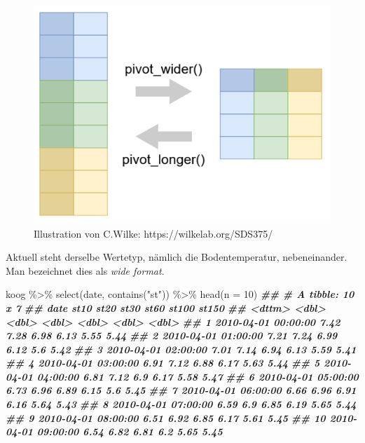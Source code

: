 \documentclass[
]{article}
\newenvironment{Shaded}{\begin{snugshade}}{\end{snugshade}}
\newcommand{\AttributeTok}[1]{\textcolor[rgb]{0.77,0.63,0.00}{#1}}
\newcommand{\DecValTok}[1]{\textcolor[rgb]{0.00,0.00,0.81}{#1}}
\newcommand{\DocumentationTok}[1]{\textcolor[rgb]{0.56,0.35,0.01}{\textbf{\textit{#1}}}}
\newcommand{\FunctionTok}[1]{\textcolor[rgb]{0.00,0.00,0.00}{#1}}
\newcommand{\NormalTok}[1]{#1}
\newcommand{\SpecialCharTok}[1]{\textcolor[rgb]{0.00,0.00,0.00}{#1}}
\newcommand{\StringTok}[1]{\textcolor[rgb]{0.31,0.60,0.02}{#1}}
\begin{document}
\begin{figure}

{\centering \includegraphics[width=9.9in]{images/042} 

}

\caption{Illustration von C.Wilke: https://wilkelab.org/SDS375/}\label{fig:unnamed-chunk-149}
\end{figure}

Aktuell steht derselbe Wertetyp, nämlich die Bodentemperatur, nebeneinander. Man bezeichnet dies als \emph{wide format}.

\begin{Shaded}
\begin{Highlighting}[]
\NormalTok{koog }\SpecialCharTok{\%\textgreater{}\%}
  \FunctionTok{select}\NormalTok{(date, }\FunctionTok{contains}\NormalTok{(}\StringTok{"st"}\NormalTok{)) }\SpecialCharTok{\%\textgreater{}\%}
  \FunctionTok{head}\NormalTok{(}\AttributeTok{n =} \DecValTok{10}\NormalTok{)}
\DocumentationTok{\#\# \# A tibble: 10 x 7}
\DocumentationTok{\#\#    date                 st10  st20  st30  st60 st100 st150}
\DocumentationTok{\#\#    \textless{}dttm\textgreater{}              \textless{}dbl\textgreater{} \textless{}dbl\textgreater{} \textless{}dbl\textgreater{} \textless{}dbl\textgreater{} \textless{}dbl\textgreater{} \textless{}dbl\textgreater{}}
\DocumentationTok{\#\#  1 2010{-}04{-}01 00:00:00  7.42  7.28  6.98  6.13  5.55  5.44}
\DocumentationTok{\#\#  2 2010{-}04{-}01 01:00:00  7.21  7.24  6.99  6.12  5.6   5.42}
\DocumentationTok{\#\#  3 2010{-}04{-}01 02:00:00  7.01  7.14  6.94  6.13  5.59  5.41}
\DocumentationTok{\#\#  4 2010{-}04{-}01 03:00:00  6.91  7.12  6.88  6.17  5.63  5.44}
\DocumentationTok{\#\#  5 2010{-}04{-}01 04:00:00  6.81  7.12  6.9   6.17  5.58  5.47}
\DocumentationTok{\#\#  6 2010{-}04{-}01 05:00:00  6.73  6.96  6.89  6.15  5.6   5.45}
\DocumentationTok{\#\#  7 2010{-}04{-}01 06:00:00  6.66  6.96  6.91  6.16  5.64  5.43}
\DocumentationTok{\#\#  8 2010{-}04{-}01 07:00:00  6.59  6.9   6.85  6.19  5.65  5.44}
\DocumentationTok{\#\#  9 2010{-}04{-}01 08:00:00  6.51  6.92  6.85  6.17  5.61  5.45}
\DocumentationTok{\#\# 10 2010{-}04{-}01 09:00:00  6.54  6.82  6.81  6.2   5.65  5.45}
\end{Highlighting}
\end{Shaded}
\end{document}
